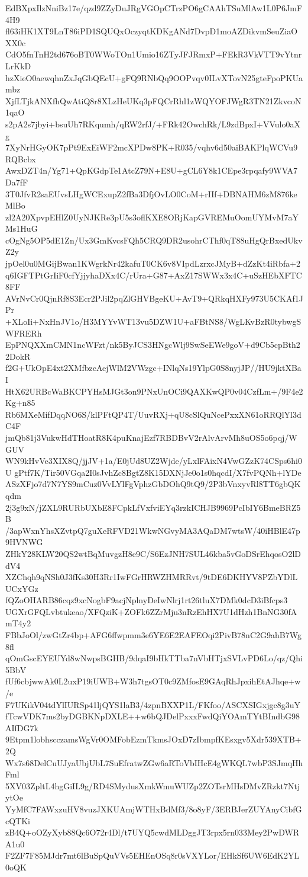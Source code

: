 EdBXpxIlzNniBz17e/qzd9ZZyDuJRgVGOpCTrzPO6gCAAhTSuMlAw1L0P6JmF4H9
fl63iHK1XT9LnT86iPD1SQUQxOczyqtKDKgANd7DvpD1moAZDikvmSeuZiaOXX0c
CdO5fnTnH2td676oBT0WWoTOn1Umio16ZTyJFJRmxP+FEkR3VkVTT9vYtnrLrKkD
hzXieO0aewqhnZxJqGbQEcU+gFQ9RNbQq9OOPvqv0ILvXTovN25gteFpoPKUambz
XjfLTjkANXfhQwAtiQ8r8XLzHeUKq3pFQCrRhl1zWQYOFJWgR3TN21ZkvcoN1qaO
s2pA2s7jbyi+bsuUh7RKqumh/qRW2rfJ/+FRk42OwchRk/L9zdBpxI+VVulo0aXg
7XyNrHGyOK7pPt9ExEiWF2mcXPDw8PK+R035/vqhv6d50aiBAKPlqWCVu9RQBcbx
AwxDZT4n/Yg71+QpKGdpTe1AtcZ79N+E8U+gCL6Y8k1CEpe3rpqafy9WVA7Da7fF
3T0JfvR2saEUvsLHgWCExupZ2fBa3DfjOvLO0CoM+rIIf+DBNAHM6zM876keMlBo
zl2A20XpvpEHlZ0UyNJKRe3pU5s3oflKXE8ORjKapGVREMuOomUYMvM7aYMs1HuG
cOgNg5OP5dE1Zn/Ux3GmKvcsFQh5CRQ9DR2usohrCThf0qT88uHgQrBxedUkvZ2y
jpOel0u0MGijBwan1KWgrkNr42kafuT0CK6v8VIpdLzrxcJMyB+dZzKt4iRbfa+2
q6IGFTPtGrIiF0cfYjjyhaDXx4C/rUra+G87+AxZ17SWWx3x4C+uSzHEbXFTC8FF
AVrNvCr0QjnRf8S3Ecr2PJil2pqZlGHVBgeKU+AvT9+QRkqHXFy973U5CKAf1JPr
+XLoIi+NxHnJV1o/H3MYYvWT13vu5DZW1U+aFBtNS8/WgLKvBzR0tybwgSWFRERh
EpPNQXXmCMN1ncWFzt/nk5ByJCS3HNgcWlj9SwSeEWe9goV+d9Cb5cpBth22DokR
f2G+UkOpE4xt2XMfbzcAejWlM2VWzgc+INlqNs19YlpG0S8nyjJP//HU9jktXBaI
HtX62URBcWaBKCPYHsMJGt3on9PNxUnOCi9QAXKwQP0v04CzfLm+/9F4e2Kg+n85
Rb6MXeMifDqqNO6S/klPFtQP4T/UuvRXj+qU8cSlQuNcePxxXN61oRRQlYl3dC4F
jmQb81j3VukwHdTHoatR8K4puKnajEzf7RBDBvV2rAlvArvMh8uOS5o6pqj/WGUV
WN9kHvVe3XIX8Q/jjJV+1a/E0jUd8UZ2Wjde/yLxlFAixN4VwGZzK74CSps6hi0U
gPtf7K/Tir50VGqa2I0sJvhZc8BgtZ8K15DXNjJe0o1s0hqcdI/X7fvPQNh+lYDe
ASzXFjo7d7N7YS9mCuz0VvLYlFgVphzGbDOhQ9tQ9/2P3bVnxyvRl8TT6gbQKqdm
2j3g9xN/jZXL9RURbUXbE8FCpkLfVxfviEYq3rzkICHJB9969PcIbIY6BmeBRZ5B
/3apWxnYhsXZvtpQ7guXeRFVD21WkwNGvyMA3AQaDM7wtsW/40iHBlE47p9HVNWG
ZHkY28KLW20QS2wtBqMuvgzH8e9C/S6EzJNH7SUL46kba5vGoDSrEhqosO2lDdV4
XZChqh9qNSh0J3fKs30H3Rr1IwFGrHRWZHMRRvt/9tDE6DKHYV8PZbYDlLUCxYGz
fQZoOHARB86cqz9xcNogbF9acjNplnyDeIwNlrj1rt26tluX7DMk0dcD3iBfcps3
UGXrGFQLvbtukeao/XFQziK+ZOFk6ZZrMju3nRzEhHX7U1dHzh1BnNG30fAmT4y2
FBbJoOl/zwGtZr4bp+AFG6ffwpmm3e6YE6E2EAFEOqi2PivB78nC2G9ahB7Wg8fl
qOmGscEYEUYd8wNwpsBGHB/9dqaI9bHkTTba7nVbHTjxSVLvPD6Lo/qz/Qhi5BbV
fUf6cbjwwAk0L2uxP19iUWB+W3h7tgsOT0c9ZMfosE9GAqRhJpxihEtAJhqe+w/e
F7UKikV04tdYlIURSp41ljQYS1laB3/4zpnBXXP1L/FKfoo/ASCXSIGxjgc8g3uY
fTcwVDK7ms2byDGBKNpDXLE++w6bQJDelPxxxFwdQiYOAmTYtBIndbG98AIfDG7k
9Etpm1lobhscczamsWgVr0OMFobEzmTkmsJOxD7zIbmpfKEsxgv5Xdr539XTB+2Q
Wx7s68DelCuUJyaUbjUbL7SuEfratwZGw6aRToVbIHcE4gWKQL7wbP3SJmqHhFml
5XV03ZpltL4hgGiIL9g/RD4SMydusXmkWmuWUZp2ZOTsrMHsDMvZRzkt7NtjytOe
YyMfC7FAWxzuHV8vuzJXKUAmjWTHxBdMf3/8o8yF/3ERBJerZUYAnyCibfGcQTKi
zB4Q+oOZyXyb88Qc6O72r4Dl/t7UYQ5cwdMLDggJT3rpx5rn033Mey2PwDWRA1u0
F2ZF7F85MJdr7mt6lBuSpQuVVs5EHEnOSq8r0sVXYLor/EHkSf6UW6EdK2YL0oQK
